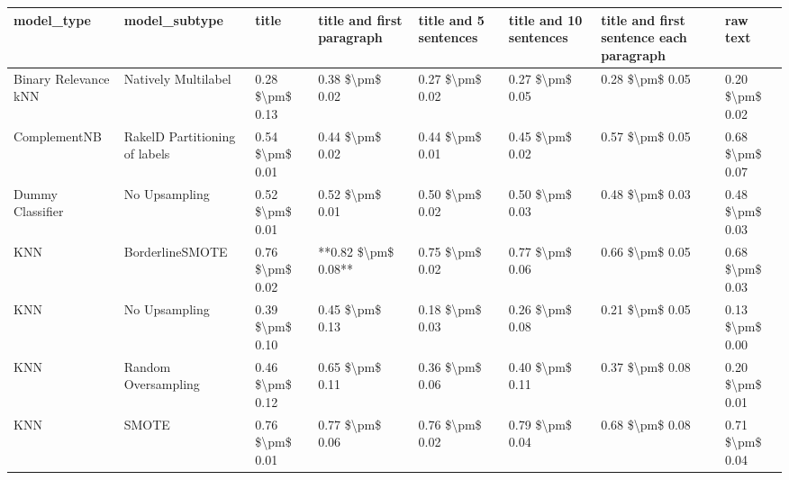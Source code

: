 \begin{tabular}{llllllll}
\toprule
                     model\_type &                 model\_subtype &           title & title and first paragraph & title and 5 sentences & title and 10 sentences & title and first sentence each paragraph &        raw text \\
\midrule
           Binary Relevance kNN &           Natively Multilabel & 0.28 \$\textbackslash pm\$ 0.13 &           0.38 \$\textbackslash pm\$ 0.02 &       0.27 \$\textbackslash pm\$ 0.02 &        0.27 \$\textbackslash pm\$ 0.05 &                         0.28 \$\textbackslash pm\$ 0.05 & 0.20 \$\textbackslash pm\$ 0.02 \\
                   ComplementNB & RakelD Partitioning of labels & 0.54 \$\textbackslash pm\$ 0.01 &           0.44 \$\textbackslash pm\$ 0.02 &       0.44 \$\textbackslash pm\$ 0.01 &        0.45 \$\textbackslash pm\$ 0.02 &                         0.57 \$\textbackslash pm\$ 0.05 & 0.68 \$\textbackslash pm\$ 0.07 \\
               Dummy Classifier &                 No Upsampling & 0.52 \$\textbackslash pm\$ 0.01 &           0.52 \$\textbackslash pm\$ 0.01 &       0.50 \$\textbackslash pm\$ 0.02 &        0.50 \$\textbackslash pm\$ 0.03 &                         0.48 \$\textbackslash pm\$ 0.03 & 0.48 \$\textbackslash pm\$ 0.03 \\
                            KNN &               BorderlineSMOTE & 0.76 \$\textbackslash pm\$ 0.02 &       **0.82 \$\textbackslash pm\$ 0.08** &       0.75 \$\textbackslash pm\$ 0.02 &        0.77 \$\textbackslash pm\$ 0.06 &                         0.66 \$\textbackslash pm\$ 0.05 & 0.68 \$\textbackslash pm\$ 0.03 \\
                            KNN &                 No Upsampling & 0.39 \$\textbackslash pm\$ 0.10 &           0.45 \$\textbackslash pm\$ 0.13 &       0.18 \$\textbackslash pm\$ 0.03 &        0.26 \$\textbackslash pm\$ 0.08 &                         0.21 \$\textbackslash pm\$ 0.05 & 0.13 \$\textbackslash pm\$ 0.00 \\
                            KNN &           Random Oversampling & 0.46 \$\textbackslash pm\$ 0.12 &           0.65 \$\textbackslash pm\$ 0.11 &       0.36 \$\textbackslash pm\$ 0.06 &        0.40 \$\textbackslash pm\$ 0.11 &                         0.37 \$\textbackslash pm\$ 0.08 & 0.20 \$\textbackslash pm\$ 0.01 \\
                            KNN &                         SMOTE & 0.76 \$\textbackslash pm\$ 0.01 &           0.77 \$\textbackslash pm\$ 0.06 &       0.76 \$\textbackslash pm\$ 0.02 &        0.79 \$\textbackslash pm\$ 0.04 &                         0.68 \$\textbackslash pm\$ 0.08 & 0.71 \$\textbackslash pm\$ 0.04 \\

\end{tabular}

